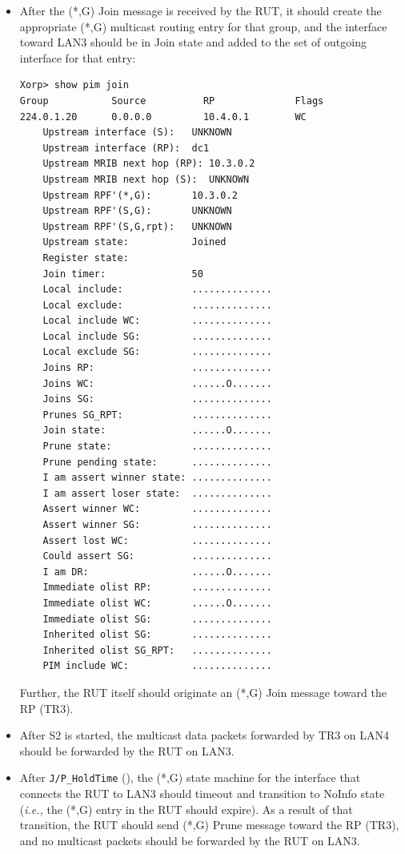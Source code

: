 \documentclass[11pt]{report}
\newcommand{\ie}{\emph{i.e.,}\xspace}
\begin{document}
\begin{itemize}

  \item After the (*,G) Join message is received by the RUT, it
  should create the appropriate (*,G) multicast routing entry for
  that group, and the interface toward LAN3 should be in Join state and
  added to the set of outgoing interface for that entry:

\begin{verbatim}
Xorp> show pim join 
Group           Source          RP              Flags
224.0.1.20      0.0.0.0         10.4.0.1        WC   
    Upstream interface (S):   UNKNOWN
    Upstream interface (RP):  dc1
    Upstream MRIB next hop (RP): 10.3.0.2
    Upstream MRIB next hop (S):  UNKNOWN
    Upstream RPF'(*,G):       10.3.0.2
    Upstream RPF'(S,G):       UNKNOWN
    Upstream RPF'(S,G,rpt):   UNKNOWN
    Upstream state:           Joined 
    Register state:           
    Join timer:               50
    Local include:            ..............
    Local exclude:            ..............
    Local include WC:         ..............
    Local include SG:         ..............
    Local exclude SG:         ..............
    Joins RP:                 ..............
    Joins WC:                 ......O.......
    Joins SG:                 ..............
    Prunes SG_RPT:            ..............
    Join state:               ......O.......
    Prune state:              ..............
    Prune pending state:      ..............
    I am assert winner state: ..............
    I am assert loser state:  ..............
    Assert winner WC:         ..............
    Assert winner SG:         ..............
    Assert lost WC:           ..............
    Could assert SG:          ..............
    I am DR:                  ......O.......
    Immediate olist RP:       ..............
    Immediate olist WC:       ......O.......
    Immediate olist SG:       ..............
    Inherited olist SG:       ..............
    Inherited olist SG_RPT:   ..............
    PIM include WC:           ..............
\end{verbatim}

  Further, the RUT itself should originate an (*,G) Join message
  toward the RP (TR3).

  \item After S2 is started, the multicast data packets forwarded by TR3
  on LAN4 should be forwarded by the RUT on LAN3.

  \item After \verb=J/P_HoldTime= ({\PimsmJPHoldTime}),
  the (*,G) state machine for the interface that connects the RUT to
  LAN3 should timeout and transition to NoInfo state
  (\ie the (*,G) entry in the RUT should expire).
  As a result of that transition, the RUT should send (*,G) Prune
  message toward the RP (TR3), and no multicast packets should be
  forwarded by the RUT on LAN3.

\end{itemize}
\end{document}
